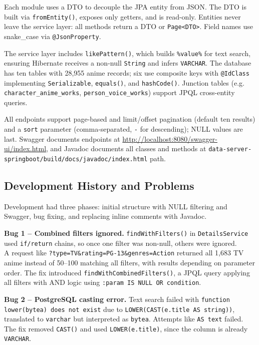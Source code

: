 \documentclass[12pt,a4paper]{article}
\begin{document}
Each module uses a DTO to decouple the JPA entity from JSON. The DTO is built via \texttt{fromEntity()}, exposes only getters, and is read-only. Entities never leave the service layer: all methods return a DTO or \texttt{Page<DTO>}. Field names use snake\_case via \texttt{@JsonProperty}.

The service layer includes \texttt{likePattern()}, which builds \texttt{\%value\%} for text search, ensuring Hibernate receives a non-null \texttt{String} and infers \texttt{VARCHAR}. The database has ten tables with 28,955 anime records; six use composite keys with \texttt{@IdClass} implementing \texttt{Serializable}, \texttt{equals()}, and \texttt{hashCode()}. Junction tables (e.g. \texttt{character\_anime\_works}, \texttt{person\_voice\_works}) support JPQL cross-entity queries.

All endpoints support page-based and limit/offset pagination (default ten results) and a \texttt{sort} parameter (comma-separated, \texttt{-} for descending); NULL values are last. Swagger documents endpoints at \url{http://localhost:8080/swagger-ui/index.html}, and Javadoc documents all classes and methods at \texttt{data-server-springboot/build/docs/javadoc/index.html} path.

\subsection{Development History and Problems}

Development had three phases: initial structure with NULL filtering and Swagger, bug fixing, and replacing inline comments with Javadoc.

\textbf{Bug 1 -- Combined filters ignored.} \texttt{findWithFilters()} in \texttt{DetailsService} used \texttt{if/return} chains, so once one filter was non-null, others were ignored. \\
A request like \texttt{?type=TV\&rating=PG-13\&genres=Action} returned all 1,683 TV anime instead of 50--100 matching all filters, with results depending on parameter order. The fix introduced \texttt{findWithCombinedFilters()}, a JPQL query applying all filters with AND logic using \texttt{:param IS NULL OR condition}.

\textbf{Bug 2 -- PostgreSQL casting error.} Text search failed with \texttt{function lower(bytea) does not exist} due to \texttt{LOWER(CAST(e.title AS string))}, translated to \texttt{varchar} but interpreted as \texttt{bytea}. Attempts like \texttt{AS text} failed. The fix removed \texttt{CAST()} and used \texttt{LOWER(e.title)}, since the column is already \texttt{VARCHAR}.
\end{document}
